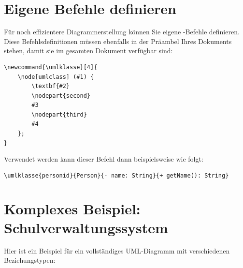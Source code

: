 \begin{ausgabe}
\end{ausgabe}



\section{Eigene Befehle definieren}

Für noch effizientere Diagrammerstellung können Sie eigene -Befehle definieren. Diese Befehlsdefinitionen müssen ebenfalls in der Präambel Ihres Dokuments stehen, damit sie im gesamten Dokument verfügbar sind:

\begin{lstlisting}[style=latex]
% Befehl fuer einfache UML-Klasse - gehoert in die Praeambel!
\newcommand{\umlklasse}[4]{
	\node[umlclass] (#1) {
		\textbf{#2}
		\nodepart{second}
		#3
		\nodepart{third}
		#4
	};
}
\end{lstlisting}

Verwendet werden kann dieser Befehl dann beispielsweise wie folgt:
\begin{lstlisting}[style=latex]
\umlklasse{personid}{Person}{- name: String}{+ getName(): String}
\end{lstlisting}



\section{Komplexes Beispiel: Schulverwaltungssystem}

Hier ist ein Beispiel für ein vollständiges UML-Diagramm mit verschiedenen Beziehungstypen:

